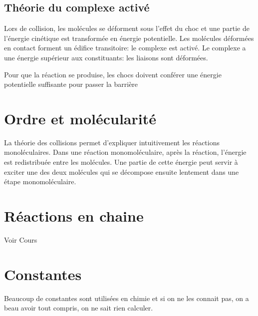 \subsection{Théorie du complexe activé}
Lors de collision, les molécules se déforment sous l'effet du choc et
une partie de l'énergie cinétique est transformée en énergie potentielle.
Les molécules déformées en contact forment un édifice transitoire:
le complexe est activé.
Le complexe a une énergie supérieur aux constituants:
les liaisons sont déformées.

Pour que la réaction se produise,
les chocs doivent conférer une énergie potentielle
suffisante pour passer la barrière

\section{Ordre et molécularité}
La théorie des collisions permet d'expliquer
intuitivement les réactions monoléculaires.
Dans une réaction monomoléculaire, après la réaction,
l'énergie est redistribuée entre les molécules.
Une partie de cette énergie peut servir à exciter une des deux molécules qui
se décompose ensuite lentement dans une étape monomoléculaire.

\section{Réactions en chaine}
Voir Cours

\appendix

\section{Constantes}
Beaucoup de constantes sont utilisées en chimie et si on ne les connait pas,
on a beau avoir tout compris, on ne sait rien calculer.

